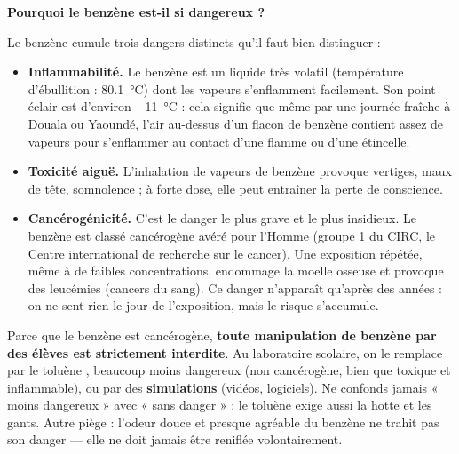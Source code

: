 \documentclass[11pt]{article}
\newcommand{\cle}[1]{{\popxbold\color{popdark}#1}}
\newcounter{popsec}
\newcounter{popsub}
\newcommand{\courssub}[1]{%
  \stepcounter{popsub}%
  \par\vspace{9pt}\noindent{\popxbold\fontsize{11.5}{13}\selectfont\color{popink}{\color{poporange}\thepopsec.\thepopsub}\hspace{6pt}#1}\par\nopagebreak\vspace{4pt}
}
\begin{document}
\courssub{Toxicité et dangers du benzène}

\textbf{Pourquoi le benzène est-il si dangereux ?}

Le benzène  cumule trois dangers distincts qu'il faut bien distinguer :

\begin{itemize}
\item \textbf{Inflammabilité.} Le benzène est un liquide très volatil (température d'ébullition : \SI{80,1}{\celsius}) dont les vapeurs s'enflamment facilement. Son point éclair est d'environ \SI{-11}{\celsius} : cela signifie que même par une journée fraîche à Douala ou Yaoundé, l'air au-dessus d'un flacon de benzène contient assez de vapeurs pour s'enflammer au contact d'une flamme ou d'une étincelle.
\item \textbf{Toxicité aiguë.} L'inhalation de vapeurs de benzène provoque vertiges, maux de tête, somnolence ; à forte dose, elle peut entraîner la perte de conscience.
\item \textbf{Cancérogénicité.} C'est le danger le plus grave et le plus insidieux. Le benzène est classé \cle{cancérogène avéré pour l'Homme} (groupe 1 du CIRC, le Centre international de recherche sur le cancer). Une exposition répétée, même à de faibles concentrations, endommage la moelle osseuse et provoque des \cle{leucémies} (cancers du sang). Ce danger n'apparaît qu'après des années : on ne sent rien le jour de l'exposition, mais le risque s'accumule.
\end{itemize}

\begin{attention}
Parce que le benzène est cancérogène, \textbf{toute manipulation de benzène par des élèves est strictement interdite}. Au laboratoire scolaire, on le remplace par le \cle{toluène} , beaucoup moins dangereux (non cancérogène, bien que toxique et inflammable), ou par des \textbf{simulations} (vidéos, logiciels). Ne confonds jamais « moins dangereux » avec « sans danger » : le toluène exige aussi la hotte et les gants. Autre piège : l'odeur douce et presque agréable du benzène ne trahit pas son danger — elle ne doit jamais être reniflée volontairement.
\end{attention}
\end{document}
